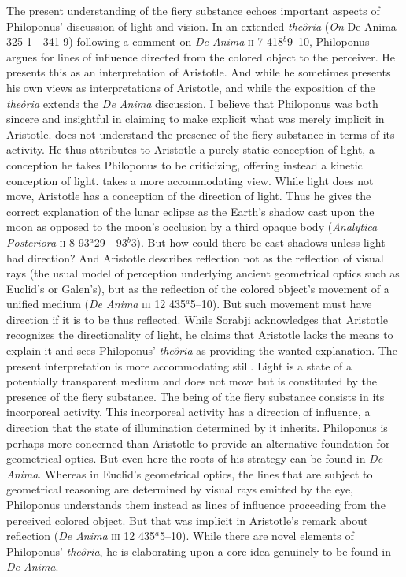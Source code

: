 The present understanding of the fiery substance echoes important aspects of Philoponus' discussion of light and vision. In an extended \emph{theôria} (\emph{On} De Anima 325 1---341 9) following a comment on \emph{De Anima} \textsc{ii} 7 418\( ^{b} \)9--10, Philoponus argues for lines of influence directed from the colored object to the perceiver. He presents this as an interpretation of Aristotle. And while he sometimes presents his own views as interpretations of Aristotle, and while the exposition of the \emph{theôria} extends the \emph{De Anima} discussion, I believe that Philoponus was both sincere and insightful in claiming to make explicit what was merely implicit in Aristotle. \citet{Sambursky:1958aa} does not understand the presence of the fiery substance in terms of its activity. He thus attributes to Aristotle a purely static conception of light, a conception he takes Philoponus to be criticizing, offering instead a kinetic conception of light. \citet[26--30]{Sorabji:1987vn} takes a more accommodating view. While light does not move, Aristotle has a conception of the direction of light. Thus he gives the correct explanation of the lunar eclipse as the Earth's shadow cast upon the moon as opposed to the moon's occlusion by a third opaque body (\emph{Analytica Posteriora} \textsc{ii} 8 93\( ^{a} \)29---93\( ^{b} \)3). But how could there be cast shadows unless light had direction? And Aristotle describes reflection not as the reflection of visual rays (the usual model of perception underlying ancient geometrical optics such as Euclid's or Galen's), but as the reflection of the colored object's movement of a unified medium (\emph{De Anima} \textsc{iii} 12 435\( ^{a} \)5--10). But such movement must have direction if it is to be thus reflected. While Sorabji acknowledges that Aristotle recognizes the directionality of light, he claims that Aristotle lacks the means to explain it and sees Philoponus' \emph{theôria} as providing the wanted explanation. The present interpretation is more accommodating still. Light is a state of a potentially transparent medium and does not move but is constituted by the presence of the fiery substance. The being of the fiery substance consists in its incorporeal activity. This incorporeal activity has a direction of influence, a direction that the state of illumination determined by it inherits. Philoponus is perhaps more concerned than Aristotle to provide an alternative foundation for geometrical optics. But even here the roots of his strategy can be found in \emph{De Anima}. Whereas in Euclid's geometrical optics, the lines that are subject to geometrical reasoning are determined by visual rays emitted by the eye, Philoponus understands them instead as lines of influence proceeding from the perceived colored object. But that was implicit in Aristotle's remark about reflection (\emph{De Anima} \textsc{iii} 12 435\( ^{a} \)5--10). While there are novel elements of Philoponus' \emph{theôria}, he is elaborating upon a core idea genuinely to be found in \emph{De Anima}.


